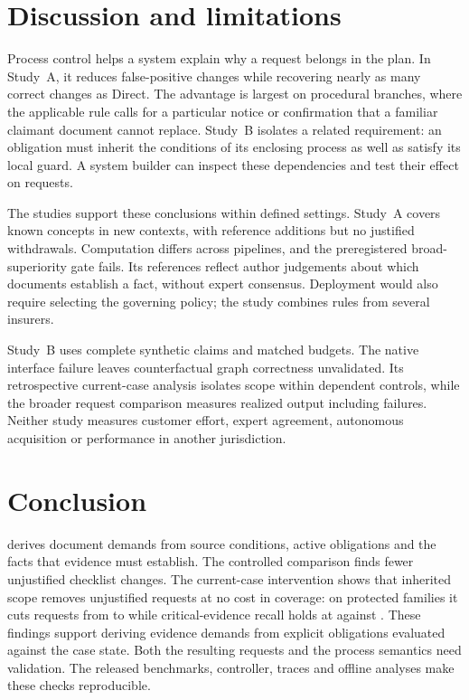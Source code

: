 \section{Discussion and limitations}
\label{sec:limitations}

Process control helps a system explain why a request belongs in the plan.
In Study~A, it reduces false-positive changes while recovering nearly as
many correct changes as Direct. The advantage is largest on procedural
branches, where the applicable rule calls for a particular notice or
confirmation that a familiar claimant document cannot replace. Study~B
isolates a related requirement: an obligation must inherit the conditions
of its enclosing process as well as satisfy its local guard. A system
builder can inspect these dependencies and test their effect on requests.

The studies support these conclusions within defined settings. Study~A
covers known concepts in new contexts, with reference additions but no
justified withdrawals. Computation differs across pipelines, and the
preregistered broad-superiority gate fails. Its references reflect author
judgements about which documents establish a fact, without expert consensus.
Deployment would also require selecting the governing policy; the study
combines rules from several insurers.

Study~B uses complete synthetic claims and matched budgets. The native
interface failure leaves counterfactual graph correctness unvalidated.
Its retrospective current-case analysis isolates scope within dependent
controls, while the broader request comparison measures realized output
including failures. Neither study measures customer effort, expert agreement,
autonomous acquisition or performance in another jurisdiction.

\section{Conclusion}
\label{sec:conclusion}

\casepath derives document demands from source conditions, active obligations
and the facts that evidence must establish. The controlled comparison finds
fewer unjustified checklist changes. The current-case intervention shows
that inherited scope removes unjustified requests at no cost in coverage: on
protected families it cuts requests from \asHidLsReq{} to \asHidCpReq{} while
critical-evidence recall holds at \asHidCpCrit{} against \asHidLsCrit. These findings support deriving
evidence demands from explicit obligations evaluated against the case state.
Both the resulting requests and the process semantics need validation.
The released benchmarks, controller, traces and offline analyses make these
checks reproducible.
